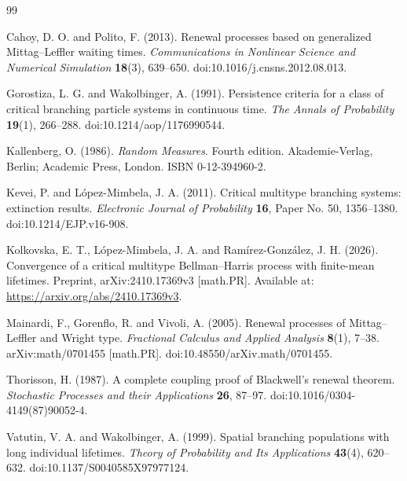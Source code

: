 \documentclass[reqno,final,11pt]{amsart}
\theoremstyle{plain}
\theoremstyle{definition}
\theoremstyle{remark}
\numberwithin{equation}{section}
\begin{document}
\begin{thebibliography}{99}




Cahoy, D. O. and Polito, F. (2013).
\newblock Renewal processes based on generalized Mittag--Leffler waiting times.
\newblock \emph{Communications in Nonlinear Science and Numerical Simulation}
\textbf{18}(3), 639--650.
\newblock doi:10.1016/j.cnsns.2012.08.013.

Gorostiza, L. G. and Wakolbinger, A. (1991).
\newblock Persistence criteria for a class of critical branching particle systems
in continuous time.
\newblock \emph{The Annals of Probability} \textbf{19}(1), 266--288.
\newblock doi:10.1214/aop/1176990544.

Kallenberg, O. (1986).
\newblock \emph{Random Measures}.
\newblock Fourth edition. Akademie-Verlag, Berlin; Academic Press, London.
\newblock ISBN 0-12-394960-2.

Kevei, P. and L\'{o}pez-Mimbela, J. A. (2011).
\newblock Critical multitype branching systems: extinction results.
\newblock \emph{Electronic Journal of Probability} \textbf{16}, Paper No. 50,
1356--1380.
\newblock doi:10.1214/EJP.v16-908.

Kolkovska, E. T., L\'{o}pez-Mimbela, J. A. and
Ram\'{i}rez-Gonz\'{a}lez, J. H. (2026).
\newblock Convergence of a critical multitype Bellman--Harris process with
finite-mean lifetimes.
\newblock Preprint, arXiv:2410.17369v3 [math.PR].
\newblock Available at: \url{https://arxiv.org/abs/2410.17369v3}.

Mainardi, F., Gorenflo, R. and Vivoli, A. (2005).
\newblock Renewal processes of Mittag--Leffler and Wright type.
\newblock \emph{Fractional Calculus and Applied Analysis} \textbf{8}(1),
7--38.
\newblock arXiv:math/0701455 [math.PR].
\newblock doi:10.48550/arXiv.math/0701455.


Thorisson, H. (1987).
\newblock A complete coupling proof of Blackwell's renewal theorem.
\newblock \emph{Stochastic Processes and their Applications} \textbf{26},
87--97.
\newblock doi:10.1016/0304-4149(87)90052-4.


Vatutin, V. A. and Wakolbinger, A. (1999).
\newblock Spatial branching populations with long individual lifetimes.
\newblock \emph{Theory of Probability and Its Applications} \textbf{43}(4),
620--632.
\newblock doi:10.1137/S0040585X97977124.

\end{thebibliography}
\end{document}
